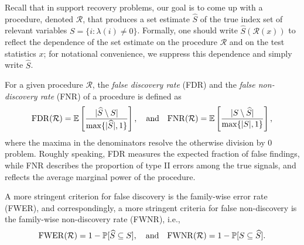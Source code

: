 Recall that in support recovery problems, our goal is to come up with a procedure, denoted $\mathcal R$, that produces a set estimate $\widehat{S}$ of the true index set of relevant variables  $S=\{i:\lambda(i)\neq 0\}$.
Formally, one should write $\widehat{S}(\mathcal{R}(x))$ to reflect the dependence of the set estimate on the procedure $\mathcal{R}$ and on the test statistics $x$; 
for notational convenience, we suppress this dependence and simply write $\widehat{S}$.

For a given procedure $\mathcal{R}$, the \emph{false discovery rate} (FDR) 
and the \emph{false non-discovery rate} (FNR) of a procedure is defined as
\begin{equation} \label{eq:FDR-FNR}
    \mathrm{FDR}(\mathcal{R}) = \E\left[\frac{|\widehat{S}\setminus S|}{\max\{|\widehat{S}|,1\}}\right],
    \quad \text{and} \quad
    \mathrm{FNR}(\mathcal{R}) = \E\left[\frac{|S\setminus \widehat{S}|}{\max\{|{S}|,1\}}\right],
\end{equation}
where the maxima in the denominators resolve the otherwise division by 0 problem. 
Roughly speaking, FDR measures the expected fraction of false findings, while FNR describes the proportion of type II errors among the true signals, and reflects the average marginal power of the procedure.

A more stringent criterion for false discovery is the family-wise error rate (FWER),
and correspondingly, a more stringent criteria for false non-discovery is the family-wise non-discovery rate (FWNR), i.e.,
\begin{equation} \label{eq:FWER-FWNR}
    \mathrm{FWER}(\mathcal{R}) = 1 - \P[\widehat{S} \subseteq S], 
    \quad \text{and} \quad
    \mathrm{FWNR}(\mathcal{R}) = 1 - \P[S \subseteq \widehat{S}].
\end{equation}

